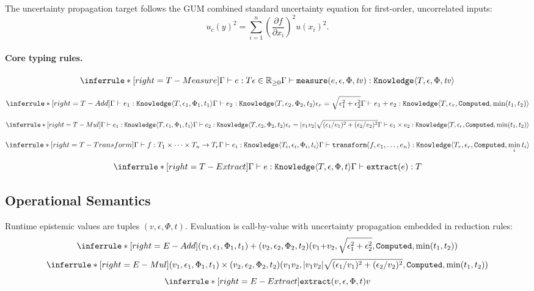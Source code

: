 \documentclass[acmsmall,screen,review,anonymous]{acmart}
\newcommand{\knowfull}[4]{\texttt{Knowledge}\langle #1, #2, #3, #4 \rangle}
\newcommand{\eps}{\epsilon}
\begin{document}
The uncertainty propagation target follows the GUM combined standard
uncertainty equation for first-order, uncorrelated inputs:
\begin{equation}
\label{eq:gum}
u_c(y)^2 = \sum_{i=1}^{n} \left(\frac{\partial f}{\partial x_i}\right)^2 u(x_i)^2.
\end{equation}

\paragraph{Core typing rules.}
\[
\inferrule*[right=T-Measure]
  {\Gamma \vdash e : T \\ \eps \in \mathbb{R}_{\ge 0}}
  {\Gamma \vdash \texttt{measure}(e,\eps,\Phi,\mathit{tv}) :
   \knowfull{T}{\eps}{\Phi}{\mathit{tv}}}
\]

\[
\inferrule*[right=T-Add]
  {\Gamma \vdash e_1 : \knowfull{T}{\eps_1}{\Phi_1}{t_1} \\
   \Gamma \vdash e_2 : \knowfull{T}{\eps_2}{\Phi_2}{t_2} \\
   \eps_r = \sqrt{\eps_1^2 + \eps_2^2}}
  {\Gamma \vdash e_1 + e_2 :
   \knowfull{T}{\eps_r}{\texttt{Computed}}{\min(t_1, t_2)}}
\]

\[
\inferrule*[right=T-Mul]
  {\Gamma \vdash e_1 : \knowfull{T}{\eps_1}{\Phi_1}{t_1} \\
   \Gamma \vdash e_2 : \knowfull{T}{\eps_2}{\Phi_2}{t_2} \\
   \eps_r = |v_1 v_2| \sqrt{(\eps_1/v_1)^2 + (\eps_2/v_2)^2}}
  {\Gamma \vdash e_1 \times e_2 :
   \knowfull{T}{\eps_r}{\texttt{Computed}}{\min(t_1, t_2)}}
\]

\[
\inferrule*[right=T-Transform]
  {\Gamma \vdash f : T_1 \times \cdots \times T_n \to T_r \\
   \Gamma \vdash e_i : \knowfull{T_i}{\eps_i}{\Phi_i}{t_i}}
  {\Gamma \vdash \texttt{transform}(f, e_1,\ldots,e_n) :
   \knowfull{T_r}{\eps_r}{\texttt{Computed}}{\min_i t_i}}
\]

\[
\inferrule*[right=T-Extract]
  {\Gamma \vdash e : \knowfull{T}{\eps}{\Phi}{t}}
  {\Gamma \vdash \texttt{extract}(e) : T}
\]

\subsection{Operational Semantics}

Runtime epistemic values are tuples $(v,\eps,\Phi,t)$.
Evaluation is call-by-value with uncertainty propagation embedded in
reduction rules:
\[
\inferrule*[right=E-Add]
  {(v_1,\eps_1,\Phi_1,t_1) + (v_2,\eps_2,\Phi_2,t_2)}
  {(v_1{+}v_2,\sqrt{\eps_1^2+\eps_2^2},\texttt{Computed},\min(t_1,t_2))}
\]
\[
\inferrule*[right=E-Mul]
  {(v_1,\eps_1,\Phi_1,t_1) \times (v_2,\eps_2,\Phi_2,t_2)}
  {(v_1 v_2, |v_1 v_2|\sqrt{(\eps_1/v_1)^2+(\eps_2/v_2)^2}, \texttt{Computed}, \min(t_1,t_2))}
\]
\[
\inferrule*[right=E-Extract]
  {\texttt{extract}(v,\eps,\Phi,t)}
  {v}
\]
\end{document}
